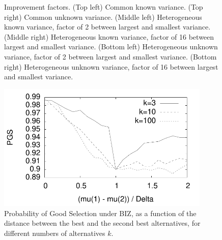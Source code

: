 \documentclass[12pt]{article}
\begin{document}
\begin{figure}[tb]
    \caption{Improvement factors.  
    (Top left) Common known variance.  
    (Top right) Common unknown variance.  
    (Middle left) Heterogeneous known variance, factor of 2 between largest and smallest variance.
    (Middle right) Heterogeneous known variance, factor of 16 between largest and smallest variance.
    (Bottom left) Heterogeneous unknown variance, factor of 2 between largest and smallest variance.
    (Bottom right) Heterogeneous unknown variance, factor of 16 between largest and smallest variance.
  }
  \end{figure}

\begin{figure}[tb]
    \center
    \includegraphics[width=4in]{pdf/FINAL-PGS}

    \caption{Probability of Good Selection under BIZ, as a function of the
    distance between the best and the second best alternatives, for different
  numbers of alternatives $k$.}
  \end{figure}
\end{document}
